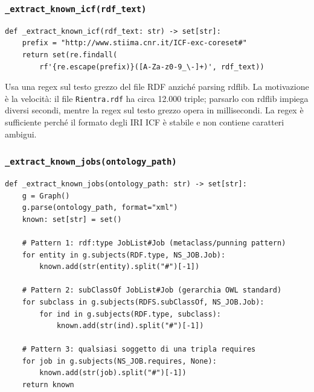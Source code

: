 \documentclass[a4paper,12pt]{article}
\begin{document}
\subsubsection{\texttt{\_\allowbreak{}extract\_\allowbreak{}known\_\allowbreak{}icf(rdf\_\allowbreak{}text)}}

\begin{lstlisting}[caption={Estrazione codici ICF validi con regex sul testo RDF.}]
def _extract_known_icf(rdf_text: str) -> set[str]:
    prefix = "http://www.stiima.cnr.it/ICF-exc-coreset#"
    return set(re.findall(
        rf'{re.escape(prefix)}([A-Za-z0-9_\-]+)', rdf_text))
\end{lstlisting}

\noindent Usa una regex sul testo grezzo del file RDF anzich\'{e} parsing rdflib.
La motivazione \`{e} la velocit\`{a}: il file \texttt{Rientra.rdf} ha
circa 12.000 triple; parsarlo con rdflib impiega diversi secondi, mentre
la regex sul testo grezzo opera in millisecondi. La regex \`{e} sufficiente
perch\'{e} il formato degli IRI ICF \`{e} stabile e non contiene caratteri
ambigui.

\subsubsection{\texttt{\_\allowbreak{}extract\_\allowbreak{}known\_\allowbreak{}jobs(ontology\_\allowbreak{}path)}}

\begin{lstlisting}[caption={Estrazione job validi con tre strategie di fallback.}]
def _extract_known_jobs(ontology_path: str) -> set[str]:
    g = Graph()
    g.parse(ontology_path, format="xml")
    known: set[str] = set()

    # Pattern 1: rdf:type JobList#Job (metaclass/punning pattern)
    for entity in g.subjects(RDF.type, NS_JOB.Job):
        known.add(str(entity).split("#")[-1])

    # Pattern 2: subClassOf JobList#Job (gerarchia OWL standard)
    for subclass in g.subjects(RDFS.subClassOf, NS_JOB.Job):
        for ind in g.subjects(RDF.type, subclass):
            known.add(str(ind).split("#")[-1])

    # Pattern 3: qualsiasi soggetto di una tripla requires
    for job in g.subjects(NS_JOB.requires, None):
        known.add(str(job).split("#")[-1])
    return known
\end{lstlisting}
\end{document}
